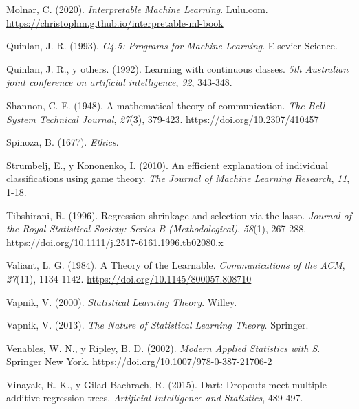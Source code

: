 \documentclass[
  spanish,
]{book}
\theoremstyle{break}
\theoremstyle{definition}
\theoremstyle{definition}
\theoremstyle{definition}
\theoremstyle{remark}
\begin{document}
\leavevmode\hypertarget{ref-molnar2020interpretable}{}%
Molnar, C. (2020). \emph{Interpretable Machine Learning}. Lulu.com. \url{https://christophm.github.io/interpretable-ml-book}

\leavevmode\hypertarget{ref-quinlan1993c4}{}%
Quinlan, J. R. (1993). \emph{C4.5: Programs for Machine Learning}. Elsevier Science.

\leavevmode\hypertarget{ref-quinlan1992learning}{}%
Quinlan, J. R., y others. (1992). Learning with continuous classes. \emph{5th Australian joint conference on artificial intelligence}, \emph{92}, 343-348.

\leavevmode\hypertarget{ref-shannon1948mathematical}{}%
Shannon, C. E. (1948). A mathematical theory of communication. \emph{The Bell System Technical Journal}, \emph{27}(3), 379-423. \url{https://doi.org/10.2307/410457}

\leavevmode\hypertarget{ref-spinoza1667ethics}{}%
Spinoza, B. (1677). \emph{Ethics}.

\leavevmode\hypertarget{ref-strumbelj2010efficient}{}%
Strumbelj, E., y Kononenko, I. (2010). An efficient explanation of individual classifications using game theory. \emph{The Journal of Machine Learning Research}, \emph{11}, 1-18.

\leavevmode\hypertarget{ref-tibshirani1996regression}{}%
Tibshirani, R. (1996). Regression shrinkage and selection via the lasso. \emph{Journal of the Royal Statistical Society: Series B (Methodological)}, \emph{58}(1), 267-288. \url{https://doi.org/10.1111/j.2517-6161.1996.tb02080.x}

\leavevmode\hypertarget{ref-valiant1984theory}{}%
Valiant, L. G. (1984). A Theory of the Learnable. \emph{Communications of the ACM}, \emph{27}(11), 1134-1142. \url{https://doi.org/10.1145/800057.808710}

\leavevmode\hypertarget{ref-vapnik1998}{}%
Vapnik, V. (2000). \emph{Statistical Learning Theory}. Willey.

\leavevmode\hypertarget{ref-vapnik2013nature}{}%
Vapnik, V. (2013). \emph{The Nature of Statistical Learning Theory}. Springer.

\leavevmode\hypertarget{ref-Venables2002Modern}{}%
Venables, W. N., y Ripley, B. D. (2002). \emph{Modern Applied Statistics with S}. Springer New York. \url{https://doi.org/10.1007/978-0-387-21706-2}

\leavevmode\hypertarget{ref-vinayak2015dart}{}%
Vinayak, R. K., y Gilad-Bachrach, R. (2015). Dart: Dropouts meet multiple additive regression trees. \emph{Artificial Intelligence and Statistics}, 489-497.
\end{document}

